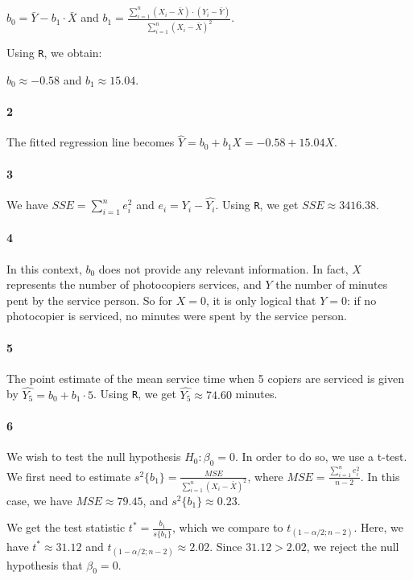 \documentclass[]{article}
\let\oldparagraph\paragraph
\renewcommand{\paragraph}[1]{\oldparagraph{#1}\mbox{}}
\begin{document}
$b_0 = \bar{Y} - b_1 \cdot \bar{X}$ and $b_1 = \frac{\sum_{i=1}^n{(X_i - \bar{X}) \cdot (Y_i - \bar{Y})}}{\sum_{i=1}^n{(X_i - \bar{X})^2}}$.

Using \texttt{R}, we obtain:

$b_0 \approx -0.58$ and $b_1 \approx 15.04$.

\paragraph{2}
The fitted regression line becomes $\hat{Y} = b_0 + b_1 X = -0.58 + 15.04 X$.

\paragraph{3}
We have $SSE = \sum_{i=1}^n{e^2_i}$ and $e_i = Y_i - \hat{Y_i}$. Using \texttt{R}, we get $SSE \approx 3416.38$.

\paragraph{4}
In this context, $b_0$ does not provide any relevant information. In fact, $X$ represents the number of photocopiers services, and $Y$ the number of minutes pent by the service person. So for $X = 0$, it is only logical that $Y = 0$: if no photocopier is serviced, no minutes were spent by the service person.

\paragraph{5}
The point estimate of the mean service time when 5 copiers are serviced is given by $\hat{Y_5} = b_0 + b_1 \cdot 5$. Using \texttt{R}, we get $\hat{Y_5} \approx 74.60$ minutes.

\paragraph{6}
We wish to test the null hypothesis $H_0: \beta_0 = 0$. In order to do so, we use a t-test. We first need to estimate $s^2\{b_1\} = \frac{MSE}{\sum_{i=1}^n{(X_i - \bar{X})^2}}$, where $MSE = \frac{\sum_{i=1}^n{e^2_i}}{n - 2}$. In this case, we have $MSE \approx 79.45$, and $s^2\{b_1\} \approx 0.23$.

We get the test statistic $t^* = \frac{b_1}{s\{b_1\}}$, which we compare to $t_{(1-\alpha/2; n-2)}$. Here, we have $t^* \approx 31.12$ and $t_{(1-\alpha/2; n-2)} \approx 2.02$. Since $31.12 > 2.02$, we reject the null hypothesis that $\beta_0 = 0$.
\end{document}
